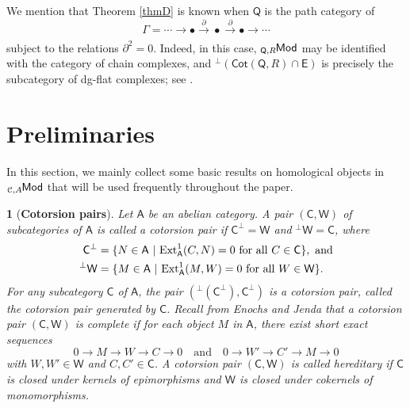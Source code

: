 \documentclass{amsart}
\theoremstyle{bfupright head,slanted body}
\theoremstyle{bfupright head,upright body}
\newtheorem{bfhpg}[res]{}               \newtheorem*{bfhpg*}{}
\theoremstyle{fixed bf head,slanted body}
\theoremstyle{fixed bf head,upright body}
\theoremstyle{numbered paragraph}
\numberwithin{equation}{res}
\newcommand{\Cot}[1]{\mathsf{Cot}(#1)}
\newcommand{\xra}[2][]{\xrightarrow[#1]{\:#2\:}}
\newcommand{\A}{\mathsf{A}}
\newcommand{\CC}{\mathsf{C}}
\newcommand{\E}{\mathsf{E}}
\newcommand{\W}{\mathsf{W}}
\newcommand{\C}{\mathcal{C}}
\newcommand{\Q}{\mathsf{Q}}
\newcommand{\lMod}[1]{{}_{#1}\mspace{-1mu}{\sf{Mod}}}
\begin{document}
We mention that Theorem \ref{thmD} is known when $\Q$ is the path category of
\[
\Gamma=\cdots \to \bullet \xra{\partial} \bullet \xra{\partial} \bullet \to \cdots
\]
subject to the relations $\partial^2=0$. Indeed, in this case, $\lMod{\Q,R}$ may be identified with the category of chain complexes, and ${^\perp(\Cot{\Q,R}\cap\E)}$ is precisely the subcategory of dg-flat complexes; see \cite{Gi04}.

\section{Preliminaries}\label{property}
\noindent
In this section, we mainly collect some basic results on homological objects in $\lMod{\C,A}$ that will be used frequently throughout the paper.

\begin{bfhpg}[\bf Cotorsion pairs]\label{cotpair}
Let $\A$ be an abelian category.
A pair $(\CC, \W)$ of subcategories of $\A$ is called a \emph{cotorsion pair} if $\CC^{\bot}=\W$ and $^{\bot}\W=\CC$, where
\begin{align*}
{\CC}^{\bot} &=
\{N\in {\sf A}\ |\ {\rm Ext}_{\A}^{1}(C,N)=0 {\rm \ for\ all}\ C\in\CC\},\ \text{and}\\
^{\bot}{\W}  &=
\{M\in {\sf A}\ |\ {\rm Ext}_{\A}^{1}(M,W)=0 {\rm \ for\ all}\ W\in\W\}.
\end{align*}
For any subcategory $\CC$ of $\A$, the pair $({^\perp(\CC^\perp)},\CC^\perp)$ is a cotorsion pair, called the cotorsion pair \emph{generated} by $\CC$. Recall from Enochs and Jenda \cite{rha} that a cotorsion pair $(\CC,\W)$ is \emph{complete} if for each object $M$ in $\A$, there exist short exact sequences
\[
0\to M\to W\to C\to 0
\quad \text{and} \quad
0\to W'\to C'\to M\to 0
\]
with $W, W'\in\W$ and $C, C'\in\CC$. A cotorsion pair $(\CC,\W)$ is called \emph{hereditary} if $\CC$ is closed under kernels of epimorphisms and $\W$ is closed under cokernels of monomorphisms.
\end{bfhpg}
\end{document}
